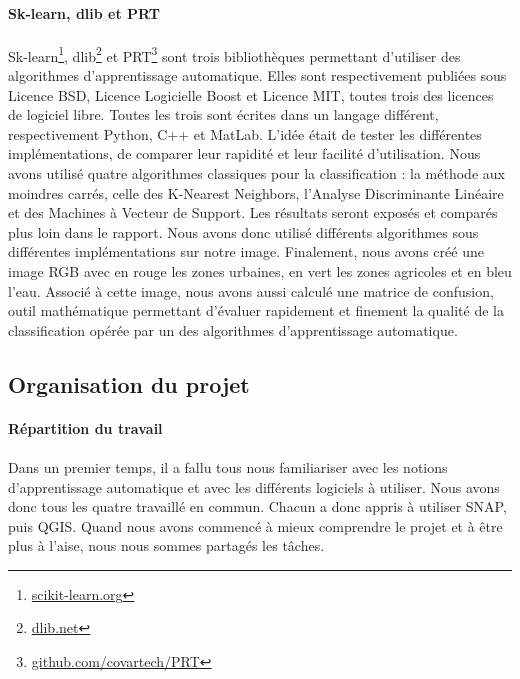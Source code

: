 \documentclass[a4paper,10pt]{article}
\begin{document}
\paragraph{Sk-learn, dlib et PRT}
\paragraph{}
Sk-learn\footnote{\href{http://scikit-learn.org}{scikit-learn.org}}, dlib\footnote{\href{http://dlib.net}{dlib.net}} et PRT\footnote{\href{https://github.com/covartech/PRT}{github.com/covartech/PRT}} sont trois bibliothèques permettant d'utiliser des algorithmes d'apprentissage automatique. Elles sont respectivement publiées sous Licence BSD, Licence Logicielle Boost et Licence MIT, toutes trois des licences de logiciel libre. Toutes les trois sont écrites dans un langage différent, respectivement Python, C++ et MatLab. L'idée était de tester les différentes implémentations, de comparer leur rapidité et leur facilité d'utilisation. Nous avons utilisé quatre algorithmes classiques pour la classification : la méthode aux moindres carrés, celle des K-Nearest Neighbors, l'Analyse Discriminante Linéaire et des Machines à Vecteur de Support. Les résultats seront exposés et comparés plus loin dans le rapport. Nous avons donc utilisé différents algorithmes sous différentes implémentations sur notre image. Finalement, nous avons créé une image RGB avec en rouge les zones urbaines, en vert les zones agricoles et en bleu l'eau. Associé à cette image, nous avons aussi calculé une matrice de confusion, outil mathématique permettant d'évaluer rapidement et finement la qualité de la classification opérée par un des algorithmes d'apprentissage automatique.
\subsection{Organisation du projet}
\paragraph{Répartition du travail}
\paragraph{}
Dans un premier temps, il a fallu tous nous familiariser avec les notions d'apprentissage automatique et avec les différents logiciels à utiliser. Nous avons donc tous les quatre travaillé en commun. Chacun a donc appris à utiliser SNAP, puis QGIS. Quand nous avons commencé à mieux comprendre le projet et à être plus à l'aise, nous nous sommes partagés les tâches.
\end{document}
